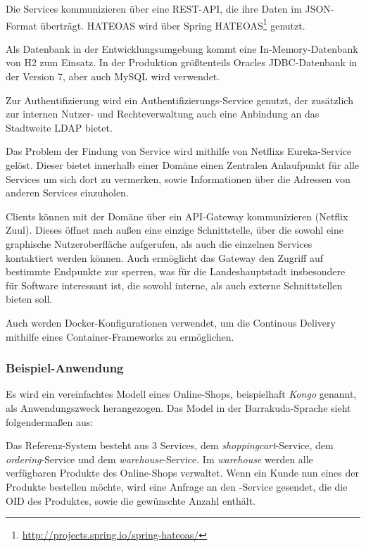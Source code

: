 \documentclass[12pt,a4paper,bibliography=totocnumbered,listof=totocnumbered]{scrartcl}
\begin{document}
Die Services kommunizieren über eine REST-\ac{API}, die ihre Daten im JSON-Format überträgt. HATEOAS wird über Spring HATEOAS\footnote{\url{http://projects.spring.io/spring-hateoas/}} genutzt.

Als Datenbank in der Entwicklungsumgebung kommt eine In-Memory-Datenbank von H2 zum Einsatz. In der Produktion größtenteils Oracles JDBC-Datenbank in der Version 7, aber auch MySQL wird verwendet.

Zur Authentifizierung wird ein Authentifizierungs-Service genutzt, der zusätzlich zur internen Nutzer- und Rechteverwaltung auch eine Anbindung an das Stadtweite \ac{LDAP} bietet.

Das Problem der Findung von Service wird mithilfe von Netflixs Eureka-Service gelöst. Dieser bietet innerhalb einer Domäne einen Zentralen Anlaufpunkt für alle Services um sich dort zu vermerken, sowie Informationen über die Adressen von anderen Services einzuholen.

Clients können mit der Domäne über ein \ac{API}-Gateway kommunizieren (Netflix Zuul). Dieses öffnet nach außen eine einzige Schnittstelle, über die sowohl eine graphische Nutzeroberfläche aufgerufen, als auch die einzelnen Services kontaktiert werden können. Auch ermöglicht das Gateway den Zugriff auf bestimmte Endpunkte zur sperren, was für die Landeshauptstadt insbesondere für Software interessant ist, die sowohl interne, als auch externe Schnittstellen bieten soll.

Auch werden Docker-Konfigurationen verwendet, um die Continous Delivery mithilfe eines Container-Frameworks zu ermöglichen.

\subsubsection{Beispiel-Anwendung}

Es wird ein vereinfachtes Modell eines Online-Shops, beispielhaft \textit{Kongo} genannt, als Anwendungszweck herangezogen. Das Model in der Barrakuda-Sprache sieht folgendermaßen aus:



Das Referenz-System besteht aus 3 Services, dem \textit{shoppingcart}-Service, dem \textit{ordering}-Service und dem \textit{warehouse}-Service. Im \textit{warehouse} werden alle verfügbaren Produkte des Online-Shops verwaltet. Wenn ein Kunde nun eines der Produkte bestellen möchte, wird eine Anfrage an den -Service gesendet, die die OID des Produktes, sowie die gewünschte Anzahl enthält.
\end{document}
